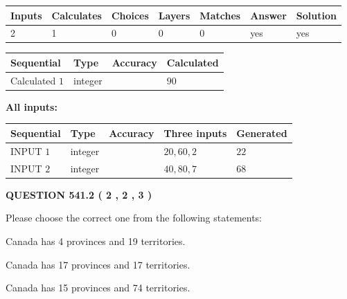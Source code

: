 \documentclass[12pt]{article}
\begin{document}
   
\noindent\begin{tabular}{|l|l|l|l|l|l|l|}
 \hline
Inputs & Calculates & Choices & Layers & Matches & Answer & Solution \\ \hline
 2  & 
 1  & 
 0
  & 
 0  & 
 0  & 
  yes & 
  yes 
  \\ \hline
 \end{tabular}
   
   
   
   
\noindent{}
   
   
  
  
\noindent\begin{tabular}{|l|l|l|l|}
\hline
 Sequential & Type & Accuracy & Calculated \\ 
\hline
 
 
  Calculated $  1 $ & integer &  & 
  $ 90 $ 
 \\  \hline  
 \end{tabular}
   
   
   
   
\noindent\vspace{0.1in}\hspace{-0.08in} {\textbf{\Large{All inputs: }}}
   
   
  
  
\noindent\begin{tabular}{|l|l|l|l|l|}
\hline
 Sequential & Type & Accuracy & Three inputs & Generated \\ 
\hline
 
 
  INPUT $  1 $ & integer &  & $
 20
 , 
 60
 , 
 2
 $ & $ 22 $ 
 \\  \hline  
 
 
  INPUT $  2 $ & integer &  & $
 40
 , 
 80
 , 
 7
 $ & $ 68 $ 
 \\  \hline  
 \end{tabular}
   
   
  
\vspace{0.2in}
  
{\textbf{\Large{QUESTION
541.2 
 ( 2 , 2 , 3 )
}}}
  
  
Please choose the correct one from the following statements:
 
 
Canada has   4 provinces and  19 territories.
 
 
Canada has  17 provinces and  17 territories.
 
 
Canada has  15 provinces and  74 territories.
 
\end{document}

